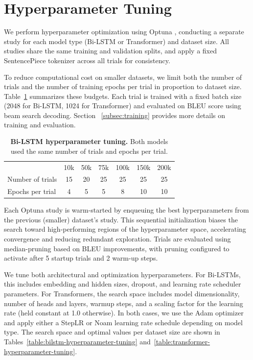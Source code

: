 \documentclass{article}
\begin{document}
\section{Hyperparameter Tuning}
\label{sec:hyperparameter-tuning}

We perform hyperparameter optimization using Optuna \citep{akiba2019optunanextgenerationhyperparameteroptimization}, conducting a separate study for each model type (Bi-LSTM or Transformer) and dataset size. All studies share the same training and validation splits, and apply a fixed SentencePiece tokenizer across all trials for consistency.

To reduce computational cost on smaller datasets, we limit both the number of trials and the number of training epochs per trial in proportion to dataset size. Table~\ref{table:optuna-budgets} summarizes these budgets. Each trial is trained with a fixed batch size (2048 for Bi-LSTM, 1024 for Transformer) and evaluated on BLEU score using beam search decoding. Section ~\ref{subsec:training} provides more details on training and evaluation.


\begin{table}[H]
  \small
  \centering
  \caption{\textbf{Bi-LSTM hyperparameter tuning.} Both models used the same number of trials and epochs per trial.}
  \label{table:optuna-budgets}
  \begin{tabular}{lcccccc}
    \toprule
      & 10k & 50k & 75k & 100k & 150k & 200k \\
      Number of trials & 15 & 20 & 25 & 25 & 25 & 25\\
      Epochs per trial & 4 & 5 & 5 & 8 & 10 & 10 \\
    \bottomrule
  \end{tabular}
\end{table}



Each Optuna study is warm-started by enqueuing the best hyperparameters from the previous (smaller) dataset’s study. This sequential initialization biases the search toward high-performing regions of the hyperparameter space, accelerating convergence and reducing redundant exploration. Trials are evaluated using median-pruning based on BLEU improvements, with pruning configured to activate after 5 startup trials and 2 warm-up steps.

We tune both architectural and optimization hyperparameters. For Bi-LSTMs, this includes embedding and hidden sizes, dropout, and learning rate scheduler parameters. For Transformers, the search space includes model dimensionality, number of heads and layers, warmup steps, and a scaling factor for the learning rate (held constant at 1.0 otherwise). In both cases, we use the Adam optimizer and apply either a StepLR or Noam learning rate schedule depending on model type. The search space and optimal values per dataset size are shown in Tables~\ref{table:bilstm-hyperparameter-tuning} and~\ref{table:transformer-hyperparameter-tuning}.
\end{document}
